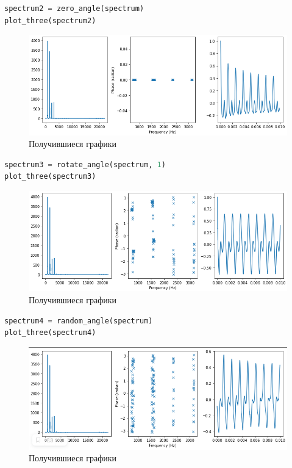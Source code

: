 \begin{lstlisting}[language=Python]
spectrum2 = zero_angle(spectrum)
plot_three(spectrum2)
\end{lstlisting}
\begin{figure}[H]
	\begin{center}
		\includegraphics[scale=0.66]{fig/lab06/lab6_11.png}
		\caption{Получившиеся графики}
	\end{center}
\end{figure}


\begin{lstlisting}[language=Python]
spectrum3 = rotate_angle(spectrum, 1)
plot_three(spectrum3)
\end{lstlisting}
\begin{figure}[H]
	\begin{center}
		\includegraphics[scale=0.66]{fig/lab06/lab6_12.png}
		\caption{Получившиеся графики}
	\end{center}
\end{figure}


\begin{lstlisting}[language=Python]
spectrum4 = random_angle(spectrum)
plot_three(spectrum4)
\end{lstlisting}
\begin{figure}[H]
	\begin{center}
		\includegraphics[scale=0.66]{fig/lab06/lab6_13.png}
		\caption{Получившиеся графики}
	\end{center}
\end{figure}

